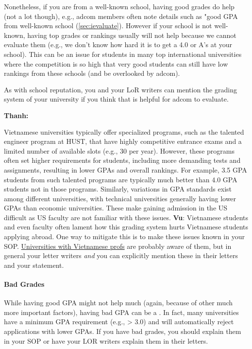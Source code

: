 \documentclass[oneside,11pt,dvipsnames]{book}
\newenvironment{commentbox}[1][]{
  \small
  \begin{mybox}
    {\small \textbf{#1}}
  }{
  \end{mybox}
}
\newcommand{\red}[1]{{\color{red}{#1}}}
\begin{document}
Nonetheless, if you are from a well-known school, having good grades do help (not a lot though), e.g., adcom members often note details such as "good GPA from well-known school (\autoref{sec:ievaluate}). However if your school is not well-known, having top grades or rankings usually will not help because we cannot evaluate them (e.g., we don't know how hard it is to get a 4.0 or A's at your school). This can be an issue for students in many top international universities where the competition is so high that very good students can still have low rankings from these schools (and be overlooked by adcom).

As with school reputation, you and your LoR writers can mention the grading system of your university if you think that is helpful for adcom to evaluate.


\begin{commentbox}[Thanh:]
    Vietnamese universities typically offer specialized programs, such as the talented engineer program at HUST, that have highly competitive entrance exams and a limited number of available slots (e.g., 30 per year). However, these programs often set higher requirements for students, including more demanding tests and assignments, resulting in lower GPAs and overall rankings. For example, 3.5 GPA students from such talented programs are typically much better than 4.0 GPA students not in those programs.  Similarly, variations in GPA standards exist among different universities, with technical universities generally having lower GPAs than economic universities. These make gaining admission in the US difficult as US faculty are not familiar with these issues.
    \tcblower
    \textbf{Vu}: Vietnamese students and even faculty often lament how this grading system hurts Vietnamese students applying abroad. One way to mitigate this is to make these issues known in your SOP.  \href{https://github.com/dynaroars/dynaroars.github.io/wiki/Viet-CS-Profs-US}{Universities with Vietnamese profs} are probably aware of them, but in general your letter writers \emph{and} you can explicitly mention these in their letters and your statement.
  \end{commentbox}

  
\paragraph{Bad Grades} 
While having good GPA might not help much (again, because of other much more important factors),
having bad GPA can be a \red{red flag}. In fact, many universities have a minimum GPA requirement (e.g., > 3.0) and will automatically reject applications with lower GPAs.  
If you have bad grades, you should explain them in your SOP or have your LOR writers explain them in their letters.
\end{document}
